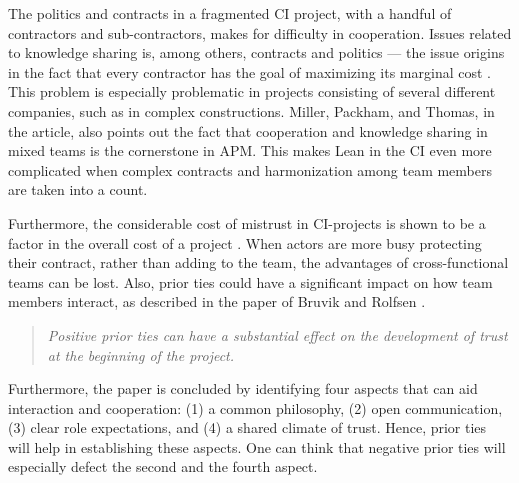 The politics and contracts in a fragmented CI project, with a handful of contractors and sub-contractors, makes for difficulty in cooperation. Issues related to knowledge sharing is, among others, contracts and politics \cite{alashwal2011knowledge} — the issue origins in the fact that every contractor has the goal of maximizing its marginal cost \cite{miller2002harmonization}. This problem is especially problematic in projects consisting of several different companies, such as in complex constructions. Miller, Packham, and Thomas, in the article, also points out the fact that cooperation and knowledge sharing in mixed teams is the cornerstone in APM. This makes Lean in the CI even more complicated when complex contracts and harmonization among team members are taken into a count. 

Furthermore, the considerable cost of mistrust in CI-projects is shown to be a factor in the overall cost of a project \cite{zaghloul2003construction}. When actors are more busy protecting their contract, rather than adding to the team, the advantages of cross-functional teams can be lost.  Also, prior ties could have a significant impact on how team members interact, as described in the paper of Bruvik and Rolfsen \cite{rolfsen}. 
\begin{quote}
    \textit{Positive prior ties can have a substantial effect on the development of trust at the beginning of the project.}
\end{quote}
Furthermore, the paper is concluded by identifying four aspects that can aid interaction and cooperation: (1) a common philosophy, (2) open communication, (3) clear role expectations, and (4) a shared climate of trust. Hence, prior ties will help in establishing these aspects. One can think that negative prior ties will especially defect the second and the fourth aspect. 

\cleardoublepage